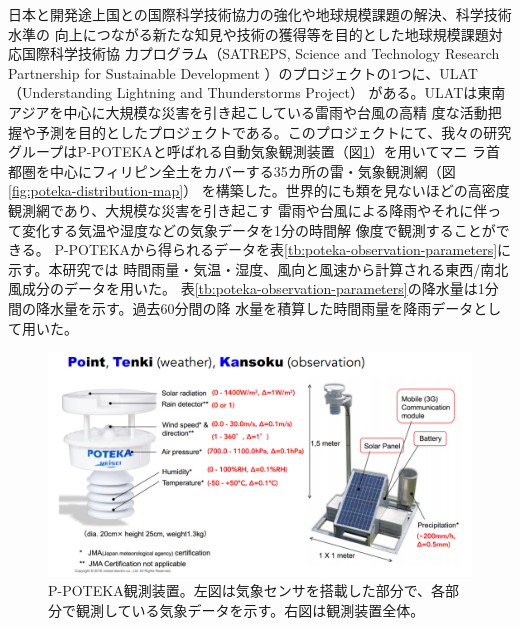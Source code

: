 日本と開発途上国との国際科学技術協力の強化や地球規模課題の解決、科学技術水準の
向上につながる新たな知見や技術の獲得等を目的とした地球規模課題対応国際科学技術協
力プログラム（SATREPS, Science and Technology Research Partnership for Sustainable
Development ）のプロジェクトの1つに、ULAT（Understanding Lightning and Thunderstorms Project）
がある。ULATは東南アジアを中心に大規模な災害を引き起こしている雷雨や台風の高精
度な活動把握や予測を目的としたプロジェクトである。このプロジェクトにて、我々の研究
グループはP-POTEKAと呼ばれる自動気象観測装置（図\ref{fig:poteka-aws}）を用いてマニ
ラ首都圏を中心にフィリピン全土をカバーする35カ所の雷・気象観測網（図\ref{fig:poteka-distribution-map}）
を構築した。世界的にも類を見ないほどの高密度観測網であり、大規模な災害を引き起こす
雷雨や台風による降雨やそれに伴って変化する気温や湿度などの気象データを1分の時間解
像度で観測することができる。
P-POTEKAから得られるデータを表\ref{tb:poteka-observation-parameters}に示す。本研究では
時間雨量・気温・湿度、風向と風速から計算される東西/南北風成分のデータを用いた。
表\ref{tb:poteka-observation-parameters}の降水量は1分間の降水量を示す。過去60分間の降
水量を積算した時間雨量を降雨データとして用いた。

\begin{figure}[H]
\begin{center}
\includegraphics[width=0.9\linewidth]{fig/methodologies/poteka-aws.png}
\captionsetup{width=0.9\linewidth}
\caption{P-POTEKA観測装置。左図は気象センサを搭載した部分で、各部分で観測している気象データを示す。右図は観測装置全体。}
\label{fig:poteka-aws}
\end{center}
\end{figure}

